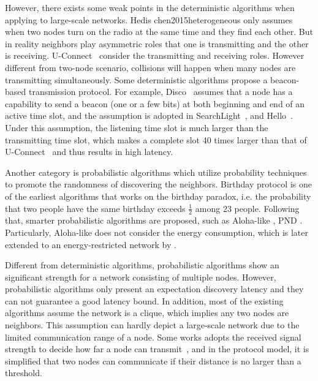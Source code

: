 However, there exists some weak points in the deterministic algorithms when applying to large-scale networks.
Hedis {chen2015heterogeneous} only assumes when two nodes turn on the radio at the same time and they find each other. 
But in reality neighbors play asymmetric roles that one is transmitting and the other is receiving.
U-Connect~\cite{kandhalu2010u} consider the transmitting and receiving roles.
However different from two-node scenario, collisions will happen when many nodes are transmitting simultaneously. 
Some deterministic algorithms propose a beacon-based transmission protocol.
For example, Disco~\cite{dutta2008practical} assumes that a node has a capability to send a beacon (one or a few bits) at both beginning and end of an active time slot, and the assumption is adopted in 
SearchLight~\cite{bakht2012searchlight}, and Hello~\cite{sun2014hello}.
Under this assumption, the listening time slot is much larger than the transmitting time slot, which makes a complete slot 
40 times larger than that of U-Connect~\cite{kandhalu2010u} and thus results in high latency.


Another category is probabilistic algorithms \cite{mcglynn2001birthday,
vasudevan2009neighbor,you2011aloha,song2014probabilistic} which utilize probability techniques to promote the randomness
of discovering the neighbors. 
Birthday protocol \cite{mcglynn2001birthday} is one of the earliest algorithms that works on the birthday
paradox, i.e. the probability that two people have the same
birthday exceeds $\frac{1}{2}$ among $23$ people. Following that,
smarter probabilistic algorithms are proposed, such as Aloha-like \cite{vasudevan2009neighbor, you2011aloha}, PND \cite{song2014probabilistic}. Particularly, Aloha-like \cite{vasudevan2009neighbor} does not consider the energy consumption, which is later extended to an energy-restricted network by \cite{you2011aloha}.

Different from deterministic algorithms,
probabilistic algorithms show an significant strength for a network consisting of multiple nodes.
However, probabilistic algorithms only present an expectation discovery latency and they
can not guarantee a good latency bound.
In addition, most of the existing algorithms assume the network is a clique, which implies any two nodes are neighbors. 
This assumption can hardly depict a large-scale network due to the limited communication range of a node.
Some works adopts the received signal strength to decide how far a node can transmit~\cite{daiya2011experimental}, and in the protocol model, it is simplified that two nodes can communicate if their distance is no larger than a threshold.


